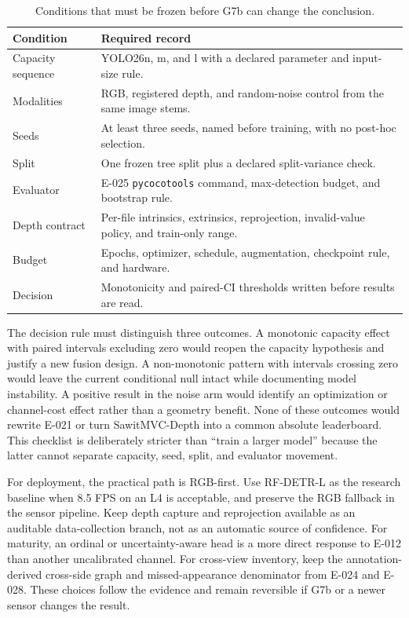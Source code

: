 \documentclass[preprint,12pt]{elsarticle}
\begin{document}
\begin{table}[H]
\centering\small
\caption{Conditions that must be frozen before G7b can change the conclusion.}
\begin{tabularx}{\columnwidth}{L{0.32\columnwidth}Y}
\toprule
\textbf{Condition} & \textbf{Required record}\\
\midrule
Capacity sequence & YOLO26n, m, and l with a declared parameter and input-size rule.\\
Modalities & RGB, registered depth, and random-noise control from the same image stems.\\
Seeds & At least three seeds, named before training, with no post-hoc selection.\\
Split & One frozen tree split plus a declared split-variance check.\\
Evaluator & E-025 \texttt{pycocotools} command, max-detection budget, and bootstrap rule.\\
Depth contract & Per-file intrinsics, extrinsics, reprojection, invalid-value policy, and train-only range.\\
Budget & Epochs, optimizer, schedule, augmentation, checkpoint rule, and hardware.\\
Decision & Monotonicity and paired-CI thresholds written before results are read.\\
\bottomrule
\end{tabularx}
\end{table}

The decision rule must distinguish three outcomes. A monotonic capacity effect
with paired intervals excluding zero would reopen the capacity hypothesis and
justify a new fusion design. A non-monotonic pattern with intervals crossing
zero would leave the current conditional null intact while documenting model
instability. A positive result in the noise arm would identify an optimization
or channel-cost effect rather than a geometry benefit. None of these outcomes
would rewrite E-021 or turn SawitMVC-Depth into a common absolute leaderboard.
This checklist is deliberately stricter than ``train a larger model'' because
the latter cannot separate capacity, seed, split, and evaluator movement.

For deployment, the practical path is RGB-first. Use RF-DETR-L as the research
baseline when 8.5 FPS on an L4 is acceptable, and preserve the RGB fallback in
the sensor pipeline. Keep depth capture and reprojection available as an
auditable data-collection branch, not as an automatic source of confidence.
For maturity, an ordinal or uncertainty-aware head is a more direct response
to E-012 than another uncalibrated channel. For cross-view inventory, keep the
annotation-derived cross-side graph and missed-appearance denominator from E-024 and
E-028. These choices follow the evidence and remain reversible if G7b or a
newer sensor changes the result.
\end{document}
